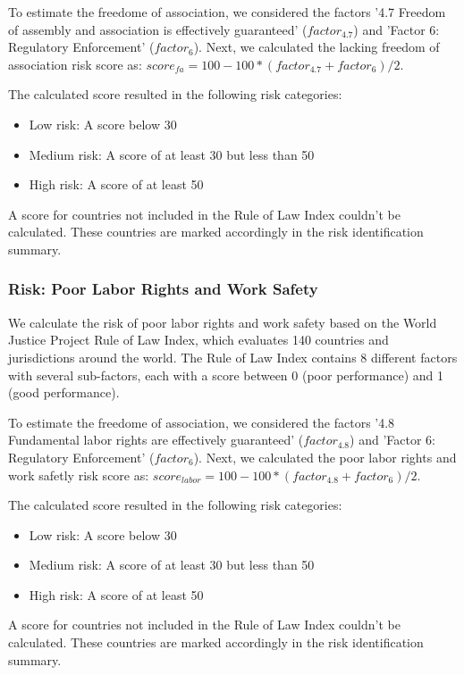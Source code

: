 \documentclass{article}
\begin{document}
To estimate the freedome of association, we considered the factors '4.7 Freedom of assembly and association is effectively guaranteed' ($factor_{4.7}$) and
'Factor 6: Regulatory Enforcement' ($factor_6$). Next, we calculated the lacking freedom of association risk score as:
$score_{fa} = 100 - 100*(factor_{4.7} + factor_6)/2$.

The calculated score resulted in the following risk categories:
\begin{itemize}
    \item Low risk: A score below 30
    \item Medium risk: A score of at least 30 but less than 50
    \item High risk: A score of at least 50
\end{itemize}

A score for countries not included in the Rule of Law Index couldn't be calculated. These countries are marked accordingly in the risk identification summary.

\subsubsection*{Risk: Poor Labor Rights and Work Safety}

We calculate the risk of poor labor rights and work safety based on the World Justice Project Rule of Law Index, which evaluates 140 countries and jurisdictions
around the world. The Rule of Law Index contains 8 different factors with several sub-factors, each with a score between 0 (poor performance) and 1 (good performance).

To estimate the freedome of association, we considered the factors '4.8 Fundamental labor rights are effectively guaranteed' ($factor_{4.8}$) and
'Factor 6: Regulatory Enforcement' ($factor_6$). Next, we calculated the poor labor rights and work safetly risk score as:
$score_{labor} = 100 - 100*(factor_{4.8} + factor_6)/2$.

The calculated score resulted in the following risk categories:
\begin{itemize}
    \item Low risk: A score below 30
    \item Medium risk: A score of at least 30 but less than 50
    \item High risk: A score of at least 50
\end{itemize}

A score for countries not included in the Rule of Law Index couldn't be calculated. These countries are marked accordingly in the risk identification summary.
\end{document}
